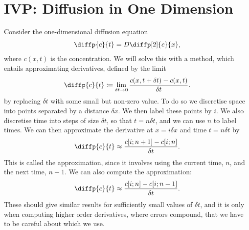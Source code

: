 \documentclass[fleqn]{NotesClass}
\begin{document}
    \section{IVP: Diffusion in One Dimension}
    Consider the one-dimensional diffusion equation
    \begin{equation}
        \diffp{c}{t} = D\diffp[2]{c}{x},
    \end{equation}
    where \(c(x, t)\) is the concentration.
    We will solve this with a  method, which entails approximating derivatives, defined by the limit
    \begin{equation}
        \diffp{c}{t} \coloneqq \lim_{\delta t \to 0} \frac{c(x, t + \delta t) - c(x, t)}{\delta t}.
    \end{equation}
    by replacing \(\delta t\) with some small but non-zero value.
    To do so we discretise space into points separated by a distance \(\delta x\).
    We then label these points by \(i\).
    We also discretise time into steps of size \(\delta t\), so that \(t = n \delta t\), and we can use \(n\) to label times.
    We can then approximate the derivative at \(x = i\delta x\) and time \(t = n\delta t\) by
    \begin{equation}
        \diffp{c}{t} \approx \frac{c[i; n + 1] - c[i; n]}{\delta t}.
    \end{equation}
    This is called the  approximation, since it involves using the current time, \(n\), and the next time, \(n + 1\).
    We can also compute the  approximation:
    \begin{equation}
        \diffp{c}{t} \approx \frac{c[i; n] - c[i; n - 1]}{\delta t}.
    \end{equation}
    These should give similar results for sufficiently small values of \(\delta t\), and it is only when computing higher order derivatives, where errors compound, that we have to be careful about which we use.
    
\end{document}
